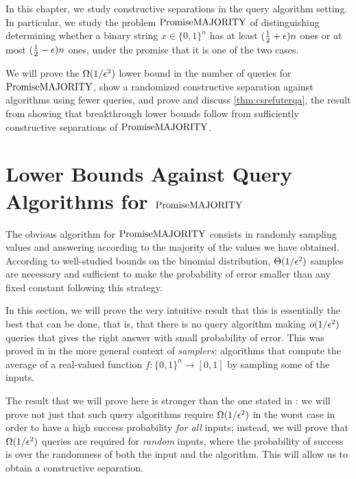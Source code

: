 
In this chapter, we study constructive separations in the query algorithm setting.
In particular, we study the problem $\mathrm{PromiseMAJORITY}$ of distinguishing determining whether
a binary string $x \in \{0, 1\}^n$ has at least $(\frac{1}{2}+\epsilon)n$ ones or
at most $(\frac{1}{2}-\epsilon)n$ ones, under the promise that it is one of the two
cases. 

We will prove the $\Omega(1/\epsilon^2)$ lower bound in the number of queries
for $\mathrm{PromiseMAJORITY}$, show a randomized constructive separation against algorithms
using fewer queries, and prove and discuss \cref{thm:csrefuterqa}, the result
from \cite{ConstructiveSeparations} showing that breakthrough lower
bounds follow from sufficiently constructive separations of $\mathrm{PromiseMAJORITY}$.  


\section{Lower Bounds Against Query Algorithms for $\mathrm{PromiseMAJORITY}$}

The obvious algorithm for $\mathrm{PromiseMAJORITY}$ consists in randomly sampling values and answering 
according to the majority of the values we have obtained. According to well-studied
bounds on the binomial distribution, $\Theta(1/\epsilon^2)$ samples
are necessary and sufficient to make the probability of error smaller than any 
fixed constant following this strategy.

In this section, we will prove the very intuitive result that this is essentially
the best that can be done, that is, that there is no query algorithm making $o(1/\epsilon^2)$
queries that gives the right answer with small probability of error. This was 
proved in \cite{Canetti95} in the more general context of \emph{samplers}: algorithms
that compute the average of a real-valued function $f \colon \{0, 1\}^n \to [0, 1]$
by sampling some of the inputs. 

The result that we will prove here is stronger than the one stated in \cite{Canetti95}:
we will prove not just that such query algorithms require $\Omega(1/\epsilon^2)$ in the 
worst case in order to have a high success probability \emph{for all} inputs; instead,
we will prove that $\Omega(1/\epsilon^2)$ queries are required for \emph{random} inputs,
where the probability of success is over the randomness of both the input and the algorithm.
This will allow us to obtain a constructive separation.

